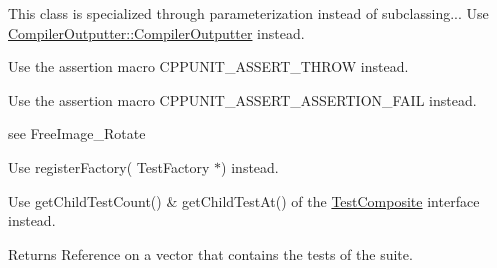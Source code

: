 \begin{DoxyRefList}
\item[\label{deprecated__deprecated000004}%
\hypertarget{deprecated__deprecated000004}{}%
Member \hyperlink{class_compiler_outputter_aa0f8f9b1fb25fe8873b7454f91dcc929}{Compiler\-Outputter\-:\-:default\-Outputter} (\hyperlink{class_test_result_collector}{Test\-Result\-Collector} $\ast$result, O\-Stream \&stream)]This class is specialized through parameterization instead of subclassing... Use \hyperlink{class_compiler_outputter_a8dd6679e24c18b3ca54a4266d9d1b812}{Compiler\-Outputter\-::\-Compiler\-Outputter} instead.  
\item[\label{deprecated__deprecated000005}%
\hypertarget{deprecated__deprecated000005}{}%
Member \hyperlink{group___writing_test_fixture_gaca8eeb6f60714baade6cbfd185868c40}{C\-P\-P\-U\-N\-I\-T\-\_\-\-T\-E\-S\-T\-\_\-\-E\-X\-C\-E\-P\-T\-I\-O\-N} (test\-Method, Exception\-Type)]Use the assertion macro C\-P\-P\-U\-N\-I\-T\-\_\-\-A\-S\-S\-E\-R\-T\-\_\-\-T\-H\-R\-O\-W instead.  
\item[\label{deprecated__deprecated000006}%
\hypertarget{deprecated__deprecated000006}{}%
Member \hyperlink{group___writing_test_fixture_ga5bdaf0444216a8f93ead13d5ae964d7e}{C\-P\-P\-U\-N\-I\-T\-\_\-\-T\-E\-S\-T\-\_\-\-F\-A\-I\-L} (test\-Method)]Use the assertion macro C\-P\-P\-U\-N\-I\-T\-\_\-\-A\-S\-S\-E\-R\-T\-\_\-\-A\-S\-S\-E\-R\-T\-I\-O\-N\-\_\-\-F\-A\-I\-L instead.  
\item[\label{deprecated__deprecated000009}%
\hypertarget{deprecated__deprecated000009}{}%
Member \hyperlink{_free_image_8h_a9759d241af1b8bb2f5b336181f959510}{Free\-Image\-\_\-\-Rotate\-Classic} (F\-I\-B\-I\-T\-M\-A\-P $\ast$dib, double angle)]see Free\-Image\-\_\-\-Rotate  
\item[\label{deprecated__deprecated000007}%
\hypertarget{deprecated__deprecated000007}{}%
Member \hyperlink{class_test_factory_registry_aff8d8215ec83fbb77d46706264e2f161}{Test\-Factory\-Registry\-:\-:register\-Factory} (const std\-::string \&name, \hyperlink{class_test_factory}{Test\-Factory} $\ast$factory)]Use register\-Factory( Test\-Factory $\ast$) instead.  
\item[\label{deprecated__deprecated000008}%
\hypertarget{deprecated__deprecated000008}{}%
Member \hyperlink{class_test_suite_ad2bd3e20523bb357b7a4608a7978ea49}{Test\-Suite\-:\-:get\-Tests} () const ]Use get\-Child\-Test\-Count() \& get\-Child\-Test\-At() of the \hyperlink{class_test_composite}{Test\-Composite} interface instead. \begin{DoxyReturn}{Returns}
Reference on a vector that contains the tests of the suite.  
\end{DoxyReturn}


\end{DoxyRefList}
